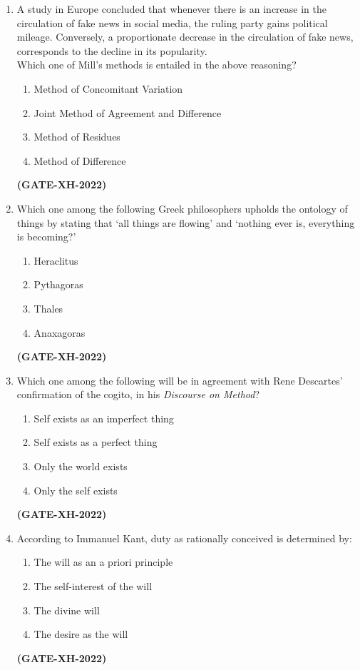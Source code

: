 \documentclass[journal]{IEEEtran}
\begin{document}
\begin{enumerate}
\item A study in Europe concluded that whenever there is an increase in the circulation of fake news in social media, the ruling party gains political mileage. Conversely, a proportionate decrease in the circulation of fake news, corresponds to the decline in its popularity.\\  
Which one of Mill’s methods is entailed in the above reasoning?  
\begin{enumerate}
\item Method of Concomitant Variation  
\item Joint Method of Agreement and Difference  
\item Method of Residues  
\item Method of Difference  
\end{enumerate}
\hfill\textbf{(GATE-XH-2022)}

\item Which one among the following Greek philosophers upholds the ontology of things by stating that ‘all things are flowing’ and ‘nothing ever is, everything is becoming?’  
\begin{multicols}{4}
\begin{enumerate}
\item Heraclitus  
\item Pythagoras  
\item Thales  
\item Anaxagoras  
\end{enumerate}
\end{multicols}
\hfill\textbf{(GATE-XH-2022)}

\item Which one among the following will be in agreement with Rene Descartes’ confirmation of the cogito, in his \textit{Discourse on Method}?  
\begin{multicols}{2}
\begin{enumerate}
\item Self exists as an imperfect thing  
\item Self exists as a perfect thing  
\item Only the world exists  
\item Only the self exists  
\end{enumerate}
\end{multicols}
\hfill\textbf{(GATE-XH-2022)}

\item According to Immanuel Kant, duty as rationally conceived is determined by:
\begin{enumerate}
\item The will as an a priori principle  
\item The self-interest of the will  
\item The divine will  
\item The desire as the will
\end{enumerate}
\hfill\textbf{(GATE-XH-2022)}


\end{enumerate}
\end{document}
